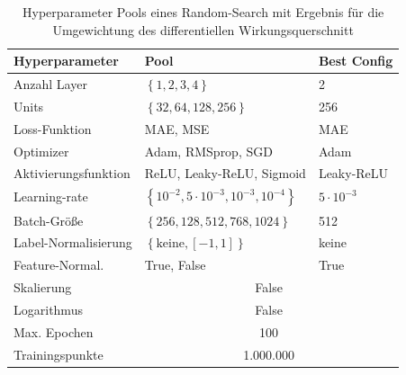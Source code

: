 \begin{table}
	\centering
	\begin{tabular}{lll}
		Hyperparameter & Pool & Best Config \\
		\hline\hline
		Anzahl Layer & $\left\lbrace 1,2,3,4\right\rbrace$ & 2 \\
		Units &$\left\lbrace 32, 64, 128, 256\right\rbrace$ & 256 \\
		Loss-Funktion & MAE, MSE & MAE \\
		Optimizer & Adam, RMSprop, SGD  & Adam\\
		Aktivierungsfunktion & ReLU, Leaky-ReLU, Sigmoid & Leaky-ReLU \\
		Learning-rate & $\left\lbrace 10^{-2}, 5 \cdot 10^{-3}, 10^{-3}, 10^{-4} \right\rbrace $ & $5 \cdot 10^{-3}$\\
		Batch-Größe & $\left\lbrace 256, 128, 512, 768, 1024 \right\rbrace $ & 512\\
		Label-Normalisierung & $\left\lbrace \text{keine}, [-1,1]\right\rbrace $ & keine\\
		Feature-Normal. & True, False & True \\
		\hline
		Skalierung & \multicolumn{2}{c}{False} \\
		Logarithmus & \multicolumn{2}{c}{False} \\ 
		Max. Epochen & \multicolumn{2}{c}{100}\\
		Trainingspunkte & \multicolumn{2}{c}{1.000.000} \\
	\end{tabular}
	\caption{Hyperparameter Pools eines Random-Search mit Ergebnis für die Umgewichtung des differentiellen Wirkungsquerschnitt}
	\label{hyperparameter-reweighting}
\end{table}
